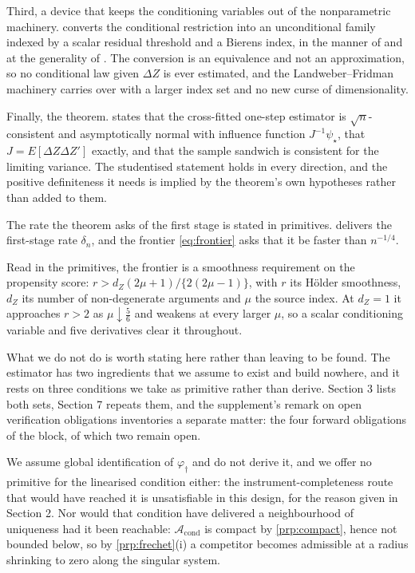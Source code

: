 \documentclass[
  12pt]{article}
\newcommand{\1}[1]{\mathds{1}\left[#1\right]}
\theoremstyle{plain}
\theoremstyle{definition}
\theoremstyle{definition}
\theoremstyle{remark}
\newcommand{\vdagger}{\varphi_{\dagger}}
\begin{document}
Third, a device that keeps the conditioning variables out of the
nonparametric machinery.  converts the conditional
restriction into an unconditional family indexed by a scalar residual
threshold and a Bierens index, in the manner of \citet{bierens1990} and
at the generality of \citet{stinchcombewhite1998}
\citep[see also][]{bierensploberger1997,escanciano2006,fanli2000}. The
conversion is an equivalence and not an approximation, so no conditional
law given \(\Delta Z\) is ever estimated, and the Landweber--Fridman
machinery carries over with a larger index set and no new curse of
dimensionality.

Finally, the theorem.  states that the cross-fitted
one-step estimator is \(\sqrt n\)-consistent and asymptotically normal
with influence function \(J^{-1}\psi_\star\), that
\(J=E[\Delta Z\Delta Z']\) exactly, and that the sample sandwich is
consistent for the limiting variance. The studentised statement holds in
every direction, and the positive definiteness it needs is implied by
the theorem's own hypotheses rather than added to them.

The rate the theorem asks of the first stage is stated in primitives.
 delivers the first-stage rate \(\delta_n\), and the
frontier \eqref{eq:frontier} asks that it be faster than \(n^{-1/4}\).

Read in the primitives, the frontier is a smoothness requirement on the
propensity score: \(r>d_Z(2\mu+1)/\{2(2\mu-1)\}\), with \(r\) its Hölder
smoothness, \(d_Z\) its number of non-degenerate arguments and \(\mu\)
the source index. At \(d_Z=1\) it approaches \(r>2\) as
\(\mu\downarrow\tfrac56\) and weakens at every larger \(\mu\), so a
scalar conditioning variable and five derivatives clear it throughout.

What we do not do is worth stating here rather than leaving to be found.
The estimator has two ingredients that we assume to exist and build
nowhere, and it rests on three conditions we take as primitive rather
than derive. Section 3 lists both sets, Section 7 repeats them, and the
supplement's remark on open verification obligations inventories a
separate matter: the four forward obligations of the block, of which two
remain open.

We assume global identification of \(\vdagger\) and do not derive it,
and we offer no primitive for the linearised condition either: the
instrument-completeness route that would have reached it is
unsatisfiable in this design, for the reason given in Section 2. Nor
would that condition have delivered a neighbourhood of uniqueness had it
been reachable: \(\mathcal A_{\mathrm{cond}}\) is compact by
\cref{prp:compact}, hence not bounded below, so by \cref{prp:frechet}(i)
a competitor becomes admissible at a radius shrinking to zero along the
singular system.
\end{document}
